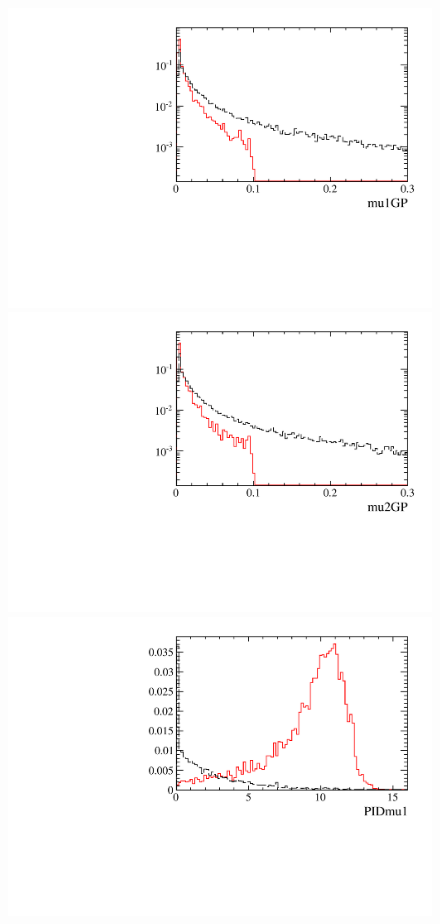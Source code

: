 \begin{figure} [htb!]
\begin{center}
\includegraphics[scale=0.20]{figs/mu1GPPARTIALptcut.pdf}
\includegraphics[scale=0.20]{figs/mu2GPPARTIALptcut.pdf}
\includegraphics[scale=0.20]{figs/PIDmu1PARTIALptcut.pdf}

\end{center}
\end{figure}
